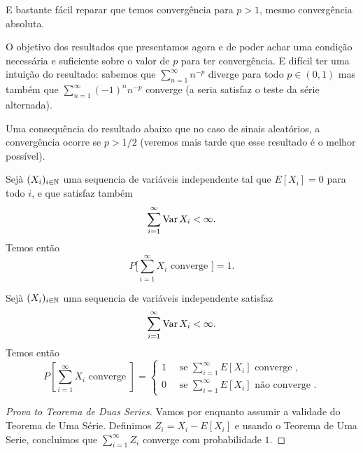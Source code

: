 \begin{topics}
\medskip

E bastante fácil reparar que temos convergência para $p > 1$, mesmo convergência absoluta.

\medskip

O objetivo dos resultados que presentamos agora e de poder achar uma condição necessária e suficiente sobre o valor de $p$ para ter convergência.
E difícil ter uma intuição do resultado: sabemos que  $\sum_{n=1}^{\infty} n^{-p}$ diverge para todo $p\in (0,1)$ mas também que
$\sum_{n=1}^{\infty}(-1)^n n^{-p}$ converge (a seria satisfaz o teste da série alternada).

\medskip

Uma consequência do resultado abaixo que no caso de sinais aleatórios, a convergência ocorre se $p > 1/2$ (veremos mais tarde que esse resultado é o melhor possível).

\begin{theorem}
  Sejà $(X_i)_{i\in {\ensuremath{\mathbb N}}}$ uma sequencia de variáveis independente tal que $E[X_i]=0$ para todo $i$, e que satisfaz também
  \begin{equation}
    \sum_{i=1}^\infty \operatorname{Var} X_i<\infty.
  \end{equation}
  Temos então
  \begin{equation}
    P \Big[ \sum_{i=1}^{\infty} X_i \text{ converge } \Big] = 1.
\end{equation}
\end{theorem}

\begin{theorem}
  Sejà $(X_i)_{i\in {\ensuremath{\mathbb N}}}$ uma sequencia de variáveis independente satisfaz
  \begin{equation}
    \sum_{i=1}^\infty \operatorname{Var} X_i<\infty.
  \end{equation}
  Temos então
  \begin{equation}
    P[\sum_{i=1}^{\infty} X_i \text{ converge } ] =
    \begin{cases}
      1 \quad \text{ se } \sum_{i=1}^\infty E[X_i] \text{ converge },\\
      0 \quad \text{ se } \sum_{i=1}^\infty E[X_i] \text{ não converge }.
    \end{cases}
  \end{equation}
\end{theorem}

\begin{proof}[Prova to Teorema de Duas Series]
  Vamos por enquanto assumir a validade do Teorema de Uma Série.
  Definimos $Z_i = X_i - E[X_i]$ e usando o Teorema de Uma Serie, concluimos que $\sum_{i=1}^{\infty} Z_i$ converge com probabilidade $1$.


\end{proof}
\end{topics}
